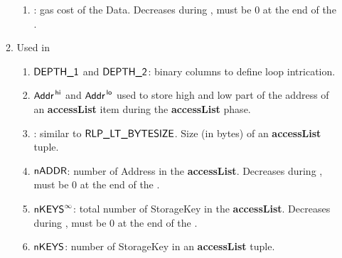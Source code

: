 \begin{enumerate}
\begin{enumerate}
\begin{enumerate}
                    \item \dataGasCost{}:
                        gas cost of the Data. Decreases during , must be 0 at the end of the .
                \end{enumerate}
            \item Used in \phaseAccessList{} 
                \begin{enumerate}
                    \item $\textsf{DEPTH\_1}$ and $\textsf{DEPTH\_2}$:
                        binary columns to define loop intrication.
                    \item $\textsf{Addr}^{\mathsf{\,hi}}$ and $\textsf{Addr}^{\mathsf{\,lo}}$ used to store high and low part of the address of an \textbf{accessList} item during the \textbf{accessList} phase.
                    \item {}:
                        similar to $\textsf{RLP\_LT\_BYTESIZE}$. Size (in bytes) of an \textbf{accessList} tuple.
                    \item $\textsf{nADDR}$:
                        number of Address in the \textbf{accessList}. Decreases during , must be 0 at the end of the .
                    \item $\textsf{nKEYS}^\infty$:
                        total number of StorageKey in the \textbf{accessList}. Decreases during , must be 0 at the end of the .
                    \item $\textsf{nKEYS}$:
                        number of StorageKey in an \textbf{accessList} tuple.
                \end{enumerate}
        \end{enumerate}
\end{enumerate}
